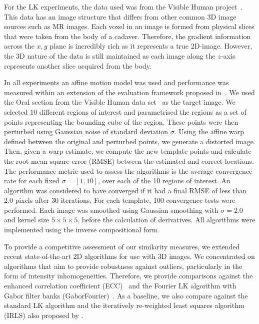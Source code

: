 For the LK experiments, the data used was from the Visible Human
project~\cite{RefWorks:81}. This data has an image structure that differs from
other common 3D image sources such as MR images. Each voxel in an image is
formed from physical slices that were taken from the body of a cadaver.
Therefore, the gradient information across the $x, y$ plane is incredibly rich
as it represents a true 2D-image. However, the 3D nature of the data is still
maintained as each image along the $z$-axis represents another slice acquired
from the body.

In all experiments an affine motion model was used and performance was measured
within an extension of the evaluation framework proposed in~\cite{RefWorks:10}.
We used the Oral section from the Visible Human data set~\cite{RefWorks:81} as
the target image. We selected 10 different regions of interest and parametrised
the regions as a set of points representing the bounding cube of the region.
These points were then perturbed using Gaussian noise of standard deviation
$\sigma$. Using the affine warp defined between the original and perturbed
points, we generate a distorted image. Then, given a warp estimate, we compute
the new template points and calculate the root mean square error (RMSE) between
the estimated and correct locations. The performance metric used to assess the
algorithms is the average convergence rate for each fixed $\sigma = [1, 10]$,
over each of the 10 regions of interest. An algorithm was considered to have
converged if it had a final RMSE of less than $2.0$ pixels after 30 iterations.
For each template, 100 convergence tests were performed. Each image was smoothed
using Gaussian smoothing with $\sigma = 2.0$ and kernel size $5\times5\times5$,
before the calculation of derivatives. All algorithms were implemented using the
inverse compositional form.

To provide a competitive assessment of our similarity measures, we extended
recent state-of-the-art 2D algorithms for use with 3D images. We concentrated on
algorithms that aim to provide robustness against outliers, particularly in the
form of intensity inhomogeneities. Therefore, we provide comparisons against the
enhanced correlation coefficient (ECC)~\cite{RefWorks:59} and the Fourier LK
algorithm with Gabor filter banks (GaborFourier)~\cite{RefWorks:73}. As a
baseline, we also compare against the standard LK algorithm and the iteratively
re-weighted least squares algorithm (IRLS) also proposed by \citet{RefWorks:53}.

